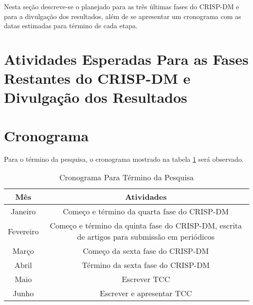 Nesta seção descreve-se o planejado para as três últimas fases do CRISP-DM e para a
divulgação dos resultados, além de se apresentar um cronograma com as datas estimadas
para término de cada etapa.

\section{Atividades Esperadas Para as Fases Restantes do CRISP-DM e Divulgação dos
Resultados}

\section{Cronograma}
Para o término da pesquisa, o cronograma mostrado na tabela \ref{cronograma} será
observado.

\begin{table}[htb]
\begin{center}
\begin{tabular}[c]{| c | c |}
    \hline
    \textbf{Mês} & \textbf{Atividades} \\
    \hline
    \hline
    Janeiro & Começo e término da quarta fase do CRISP-DM \\
    \hline
    \hline
    Fevereiro & Começo e término da quinta fase do CRISP-DM, escrita de artigos para
    submissão em periódicos\\
    \hline
    \hline
    Março & Começo da sexta fase do CRISP-DM \\
    \hline
    \hline
    Abril & Término da sexta fase do CRISP-DM \\
    \hline
    \hline
    Maio & Escrever TCC\\
    \hline
    \hline
    Junho & Escrever e apresentar TCC\\
    \hline
\end{tabular}
\end{center}
\caption{Cronograma Para Término da Pesquisa}
\label{cronograma}
\end{table}

